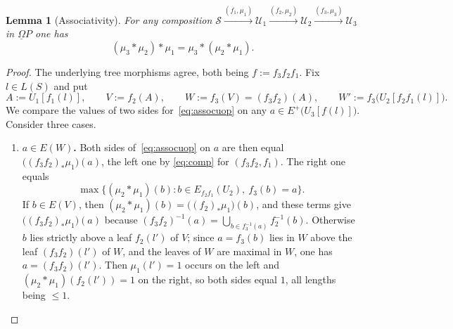 \documentclass{amsart}
\newtheorem{lemma}[formula]{Lemma}
\theoremstyle{definition}
\theoremstyle{remark}
\newcommand{\lb}{\lbrace}
\newcommand{\rb}{\rbrace}
\begin{document}
	\begin{lemma}[Associativity]\label{lm:assoc}
		For any composition $\mathcal S\xrightarrow{(f_1,\mu_1)}\mathcal U_1\xrightarrow{(f_2,\mu_2)}\mathcal U_2
		\xrightarrow{(f_3,\mu_3)}\mathcal U_3$ in $\underline\Omega P$ one has
		\begin{equation}\label{eq:assocuop}
			(\mu_3*\mu_2)*\mu_1=\mu_3*(\mu_2*\mu_1).
		\end{equation}
	\end{lemma}
	\begin{proof}
		The underlying tree morphisms agree, both being $f:=f_3f_2f_1$. 
		Fix $l\in L(S)$ and put
		\[
			A:=U_1[f_1(l)],\qquad V:=f_2(A),\qquad W:=f_3(V)=(f_3f_2)(A),\qquad W':=f_3\bigl(U_2[f_2f_1(l)]\bigr).
		\]
		We compare the values of two sides for~\eqref{eq:assocuop} on any $a\in E^{+}\bigl(U_3[f(l)]\bigr)$. 
		Consider three cases.
		
		\begin{enumerate}[label=(\roman*)]
		\item \textbf{$a\in E(W)$.} 
		Both sides of~\eqref{eq:assocuop} on $a$ are then equal $\bigl((f_3f_2)_*\mu_1\bigr)(a)$, the left one by
		\eqref{eq:comp} for $(f_3f_2,f_1)$. The right one equals
		\[
			\max\lb(\mu_2*\mu_1)(b)\colon b\in E_{f_2f_1}(U_2),\ f_3(b)=a\rb.
		\] 
		If $b\in E(V)$, then
		$(\mu_2*\mu_1)(b)=\bigl((f_2)_*\mu_1\bigr)(b)$, and these terms give $\bigl((f_3f_2)_*\mu_1\bigr)(a)$
		because $(f_3f_2)^{-1}(a)=\bigcup_{b\in f_3^{-1}(a)}f_2^{-1}(b)$. Otherwise $b$ lies strictly above a
		leaf $f_2(l')$ of $V$; since $a=f_3(b)$ lies in $W$ above the leaf $(f_3f_2)(l')$ of $W$, and the
		leaves of $W$ are maximal in $W$, one has $a=(f_3f_2)(l')$. Then $\mu_1(l')=1$ occurs on the left and
		$(\mu_2*\mu_1)(f_2(l'))=1$ on the right, so both sides equal $1$, all lengths being $\leqslant1$.
		

\end{enumerate}
\end{proof}
\end{document}
